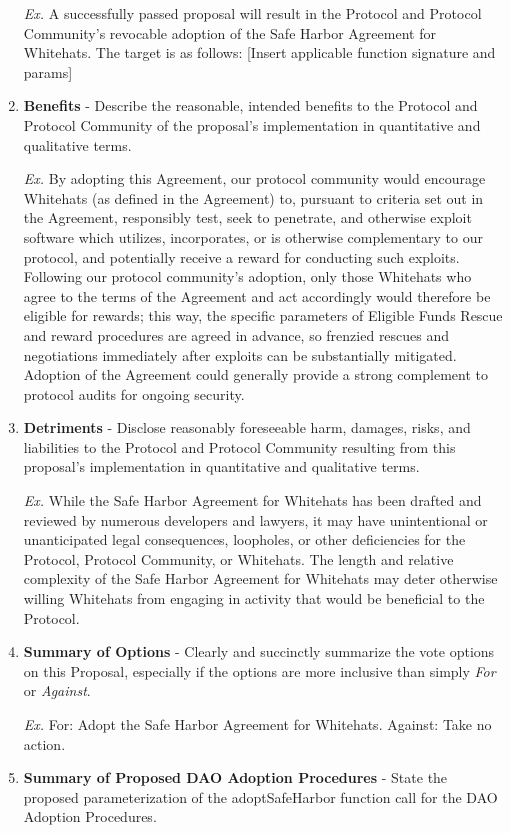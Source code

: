 \begin{enumerate}
          \textit{Ex.} A successfully passed proposal will result in the Protocol and Protocol Community's revocable adoption of the Safe Harbor Agreement for Whitehats. The target is as follows: [Insert applicable function signature and params]

    \item \textbf{Benefits} - Describe the reasonable, intended benefits to the Protocol and Protocol Community of the proposal's implementation in quantitative and qualitative terms.

          \textit{Ex.} By adopting this Agreement, our protocol community would encourage Whitehats (as defined in the Agreement) to, pursuant to criteria set out in the Agreement, responsibly test, seek to penetrate, and otherwise exploit software which utilizes, incorporates, or is otherwise complementary to our protocol, and potentially receive a reward for conducting such exploits. Following our protocol community's adoption, only those Whitehats who agree to the terms of the Agreement and act accordingly would therefore be eligible for rewards; this way, the specific parameters of Eligible Funds Rescue and reward procedures are agreed in advance, so frenzied rescues and negotiations immediately after exploits can be substantially mitigated. Adoption of the Agreement could generally provide a strong complement to protocol audits for ongoing security.

    \item \textbf{Detriments} - Disclose reasonably foreseeable harm, damages, risks, and liabilities to the Protocol and Protocol Community resulting from this proposal's implementation in quantitative and qualitative terms.

          \textit{Ex.} While the Safe Harbor Agreement for Whitehats has been drafted and reviewed by numerous developers and lawyers, it may have unintentional or unanticipated legal consequences, loopholes, or other deficiencies for the Protocol, Protocol Community, or Whitehats. The length and relative complexity of the Safe Harbor Agreement for Whitehats may deter otherwise willing Whitehats from engaging in activity that would be beneficial to the Protocol.

    \item \textbf{Summary of Options} - Clearly and succinctly summarize the vote options on this Proposal, especially if the options are more inclusive than simply \textit{For} or \textit{Against}.

          \textit{Ex.} For: Adopt the Safe Harbor Agreement for Whitehats. Against: Take no action.

    \item \textbf{Summary of Proposed DAO Adoption Procedures} - State the proposed parameterization of the adoptSafeHarbor function call for the DAO Adoption Procedures.
\end{enumerate}
